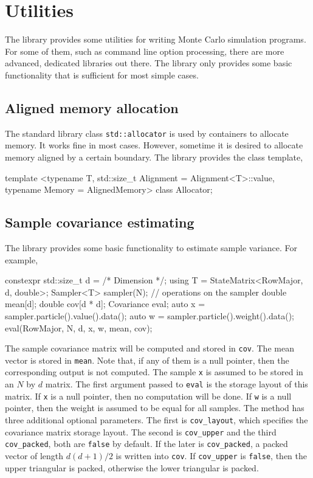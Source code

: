 \chapter{Utilities}
\label{chap:Utilities}

The library provides some utilities for writing Monte Carlo simulation
programs. For some of them, such as command line option processing, there are
more advanced, dedicated libraries out there. The library only provides some
basic functionality that is sufficient for most simple cases.

\section{Aligned memory allocation}
\label{sec:Aligned memory allocation}

The standard library class \verb|std::allocator| is used by containers to
allocate memory. It works fine in most cases. However, sometime it is desired
to allocate memory aligned by a certain boundary. The library provides the
class template,
\begin{cppcode}
  template <typename T, std::size_t Alignment = Alignment<T>::value,
      typename Memory = AlignedMemory>
  class Allocator;
\end{cppcode}

\section{Sample covariance estimating}
\label{sec:Sample covariance estimating}

The library provides some basic functionality to estimate sample variance. For
example,
\begin{cppcode}
  constexpr std::size_t d = /* Dimension */;
  using T = StateMatrix<RowMajor, d, double>;
  Sampler<T> sampler(N);
  // operations on the sampler
  double mean[d];
  double cov[d * d];
  Covariance eval;
  auto x = sampler.particle().value().data();
  auto w = sampler.particle().weight().data();
  eval(RowMajor, N, d, x, w, mean, cov);
\end{cppcode}
The sample covariance matrix will be computed and stored in \verb|cov|. The
mean vector is stored in \verb|mean|. Note that, if any of them is a null
pointer, then the corresponding output is not computed. The sample \verb|x| is
assumed to be stored in an $N$ by $d$ matrix. The first argument passed to
\verb|eval| is the storage layout of this matrix. If \verb|x| is a null
pointer, then no computation will be done. If \verb|w| is a null pointer, then
the weight is assumed to be equal for all samples. The method has three
additional optional parameters. The first is \verb|cov_layout|, which specifies
the covariance matrix storage layout. The second is \verb|cov_upper| and the
third \verb|cov_packed|, both are \verb|false| by default. If the later is
\verb|cov_packed|, a packed vector of length $d(d+1)/2$ is written into
\verb|cov|. If \verb|cov_upper| is \verb|false|, then the upper triangular is
packed, otherwise the lower triangular is packed.

